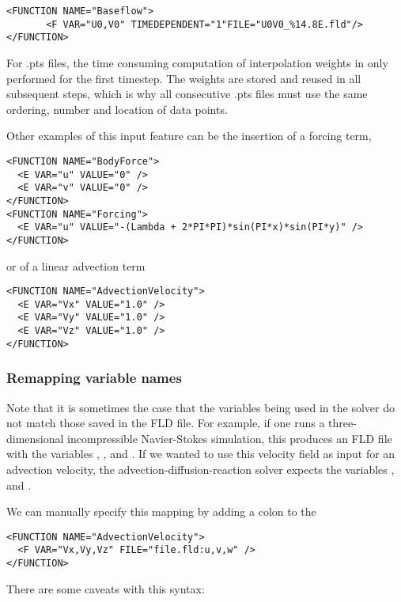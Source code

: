 \begin{lstlisting}[style=XMLStyle]
<FUNCTION NAME="Baseflow">
       <F VAR="U0,V0" TIMEDEPENDENT="1"FILE="U0V0_%14.8E.fld"/>
</FUNCTION>
\end{lstlisting}

For .pts files, the time consuming computation of interpolation weights in only
performed for the first timestep. The weights are stored and reused in all subsequent steps, 
which is why all consecutive .pts files must use the same ordering, number and location of
data points.

Other examples of this input feature can be the insertion of a forcing term,

\begin{lstlisting}[style=XMLStyle]
<FUNCTION NAME="BodyForce">
  <E VAR="u" VALUE="0" />
  <E VAR="v" VALUE="0" />
</FUNCTION>
<FUNCTION NAME="Forcing">
  <E VAR="u" VALUE="-(Lambda + 2*PI*PI)*sin(PI*x)*sin(PI*y)" />
</FUNCTION>
\end{lstlisting}

or of a linear advection term

\begin{lstlisting}[style=XMLStyle]
<FUNCTION NAME="AdvectionVelocity">
  <E VAR="Vx" VALUE="1.0" />
  <E VAR="Vy" VALUE="1.0" />
  <E VAR="Vz" VALUE="1.0" />
</FUNCTION>
\end{lstlisting}

\subsubsection{Remapping variable names}

Note that it is sometimes the case that the variables being used in the solver
do not match those saved in the FLD file. For example, if one runs a
three-dimensional incompressible Navier-Stokes simulation, this produces an FLD
file with the variables , ,  and . If we
wanted to use this velocity field as input for an advection velocity, the
advection-diffusion-reaction solver expects the variables , 
and .

We can manually specify this mapping by adding a colon to the

\begin{lstlisting}[style=XMLStyle]
<FUNCTION NAME="AdvectionVelocity">
  <F VAR="Vx,Vy,Vz" FILE="file.fld:u,v,w" />
</FUNCTION>
\end{lstlisting}

There are some caveats with this syntax:

